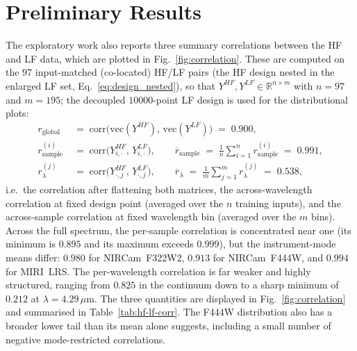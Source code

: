 \documentclass[11pt,a4paper]{article}
\newcommand{\nHF}{97}          %
\newcommand{\nLFpaired}{97}    %
\newcommand{\nLFtenk}{10000}   %
\newcommand{\nwl}{195}         %
\newcommand{\globalr}{0.900}       %
\newcommand{\persampmean}{0.991}   %
\newcommand{\persampmin}{0.895}    %
\newcommand{\persampmax}{0.999}    %
\newcommand{\perwlmean}{0.538}     %
\newcommand{\perwlmin}{0.212}      %
\newcommand{\perwlmax}{0.825}      %
\newcommand{\perwlminlam}{4.29}    %
\newcommand{\persampFThreeTwoTwo}{0.980} %
\newcommand{\persampFFourFourFour}{0.913} %
\newcommand{\persampMIRI}{0.994}          %
\begin{document}
\section{Preliminary Results}
The exploratory work also reports three
summary correlations between the HF and LF data, which are plotted in
Fig.~\ref{fig:correlation}.
These are computed on the $\nLFpaired{}$ input-matched (co-located) HF/LF pairs (the HF
design nested in the enlarged LF set, Eq.~\ref{eq:design_nested}), so that
$Y^{HF}, Y^{LF} \in \mathbb{R}^{n \times m}$ with $n = \nHF{}$ and
$m = \nwl{}$; the decoupled $\nLFtenk{}$-point LF design is used for the
distributional plots:
\begin{align}
r_{\mathrm{global}} \;&=\;
\mathrm{corr}\!\bigl(\mathrm{vec}(Y^{HF}),\,\mathrm{vec}(Y^{LF})\bigr)
\;=\; \globalr{}, \\[0.3em]
r_{\mathrm{sample}}^{(i)} \;&=\;
\mathrm{corr}\!\bigl(Y^{HF}_{i,\cdot},\,Y^{LF}_{i,\cdot}\bigr),
\qquad
\overline{r}_{\mathrm{sample}} \;=\;
\tfrac{1}{n}\sum_{i=1}^{n} r_{\mathrm{sample}}^{(i)} \;=\; \persampmean{}, \\[0.3em]
r_{\lambda}^{(j)} \;&=\;
\mathrm{corr}\!\bigl(Y^{HF}_{\cdot,j},\,Y^{LF}_{\cdot,j}\bigr),
\qquad
\overline{r}_{\lambda} \;=\;
\tfrac{1}{m}\sum_{j=1}^{m} r_{\lambda}^{(j)} \;=\; \perwlmean{},
\end{align}
i.e.\ the correlation after flattening both matrices, the
across-wavelength correlation at fixed design point (averaged over the
$n$ training inputs), and the across-sample correlation at fixed
wavelength bin (averaged over the $m$ bins). Across the full spectrum, the
per-sample correlation is concentrated near one (its minimum is
$\persampmin{}$ and its maximum exceeds $\persampmax{}$), but the
instrument-mode means differ: $\persampFThreeTwoTwo{}$ for NIRCam~F322W2,
$\persampFFourFourFour{}$ for NIRCam~F444W, and $\persampMIRI{}$ for
MIRI~LRS. The per-wavelength correlation is far weaker and highly structured,
ranging from $\perwlmax{}$ in the continuum down to a sharp minimum of
$\perwlmin{}$ at $\lambda=\perwlminlam\,\mu$m. The three quantities are displayed in
Fig.~\ref{fig:correlation} and summarised in Table~\ref{tab:hf-lf-corr}.
The F444W distribution also has a broader lower tail than its mean alone
suggests, including a small number of negative mode-restricted correlations.
\end{document}
